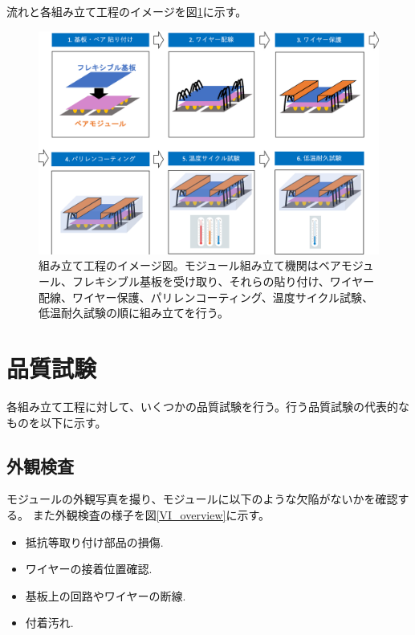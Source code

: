 流れと各組み立て工程のイメージを図\ref{assembly_flow}に示す。
\begin{figure}[bpt]\centering
\includegraphics[width=12cm]{./assembly_flow.png}
\caption[組み立て工程のイメージ図]{組み立て工程のイメージ図。モジュール組み立て機関はベアモジュール、フレキシブル基板を受け取り、それらの貼り付け、ワイヤー配線、ワイヤー保護、パリレンコーティング、温度サイクル試験、低温耐久試験の順に組み立てを行う。}
\label{assembly_flow}
\end{figure}

\section{品質試験}
各組み立て工程に対して、いくつかの品質試験を行う。行う品質試験の代表的なものを以下に示す。

\subsection{外観検査}
モジュールの外観写真を撮り、モジュールに以下のような欠陥がないかを確認する。
また外観検査の様子を図\ref{VI_overview}に示す。
\begin{itemize}
  \item 抵抗等取り付け部品の損傷.
  \item ワイヤーの接着位置確認.
  \item 基板上の回路やワイヤーの断線.
  \item 付着汚れ.
\end{itemize}

